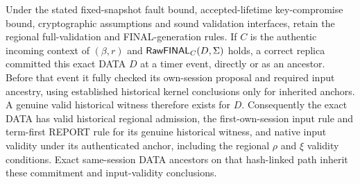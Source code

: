 \begin{proposition}
\label{prop:final-kernel-soundness}
Under the stated fixed-snapshot fault bound, accepted-lifetime
key-compromise bound, cryptographic assumptions and sound validation
interfaces, retain the regional full-validation and FINAL-generation
rules. If $C$ is the authentic incoming context of $(\beta,r)$ and
$\mathsf{RawFINAL}_C(D,\Sigma)$ holds, a correct replica committed this
exact DATA $D$ at a timer event, directly or as an ancestor. Before that
event it fully checked its own-session proposal and required input
ancestry, using established historical kernel conclusions only for
inherited anchors. A genuine valid historical witness therefore exists
for $D$. Consequently the exact DATA has
valid historical regional admission, the first-own-session input rule
and term-first REPORT rule for
its genuine historical witness, and native input validity under
its authenticated anchor, including the regional $\rho$ and $\xi$
validity conditions. Exact same-session
DATA ancestors on that hash-linked path inherit these commitment and
input-validity conclusions.
\end{proposition}
